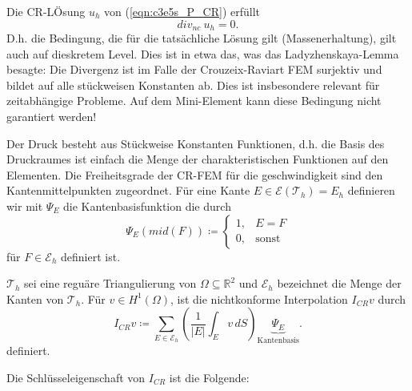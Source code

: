 \documentclass[../skript.tex]{subfiles}
\begin{document}
\begin{remark}\label{rem:c3e5s3}
	Die CR-LÖsung $u_h$ von (\ref{eqn:c3e5s_P_CR}) erfüllt
	\[
		div_{nc}\:u_h = 0.
	\]
	D.h. die Bedingung, die für die tatsächliche Lösung gilt (Massenerhaltung), gilt auch auf dieskretem Level. Dies ist in etwa das, was das Ladyzhenskaya-Lemma besagte: Die Divergenz ist im Falle der Crouzeix-Raviart FEM surjektiv und bildet auf alle stückweisen Konstanten ab. Dies ist insbesondere relevant für zeitabhängige Probleme. Auf dem Mini-Element kann diese Bedingung nicht garantiert werden!
\end{remark}


\begin{remark}[Basis]\label{rem:c3e5s4}
	Der Druck besteht aus Stückweise Konstanten Funktionen, d.h. die Basis des Druckraumes ist einfach die Menge der charakteristischen Funktionen auf den Elementen.\newline\noindent
	Die Freiheitsgrade der CR-FEM für die geschwindigkeit sind den Kantenmittelpunkten zugeordnet. Für eine Kante $E\in\mathcal{E}(\mathcal{T}_h)= E_h$ definieren wir mit $\Psi_E$ die Kantenbasisfunktion die durch
	\[
		\Psi_E(mid(F)) \coloneqq \begin{cases}1,&E=F\\0,&\text{sonst}\end{cases}
	\]
	für $F\in\mathcal{E}_h$ definiert ist.
\end{remark}

\begin{definition}\label{def:c3e5s5}
	$\mathcal{T}_h$ sei eine reguäre Triangulierung von $\Omega\subseteq\mathbb{R}^2$ und $\mathcal{E}_h$ bezeichnet die Menge der Kanten von $\mathcal{T}_h$. Für $v\in H^1(\Omega)$, ist die nichtkonforme Interpolation $I_{CR}v$ durch 
	\[
		I_{CR}v \coloneqq \sum_{E\in\mathcal{E}_h} \left( \frac{1}{|E|} \int_E v\,dS \right)\underbrace{\Psi_E}_{\text{Kantenbasis}}.
	\]
	definiert.
\end{definition}

Die Schlüsseleigenschaft von $I_{CR}$ ist die Folgende:
\end{document}
